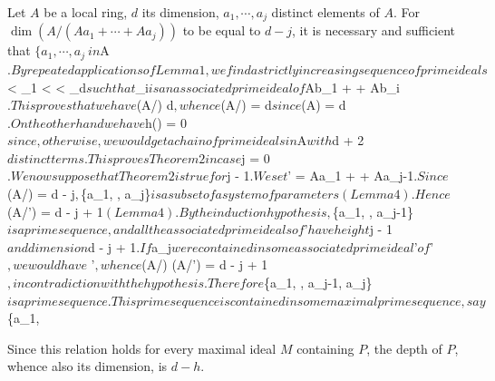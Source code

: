 Let $A$ be a local ring, $d$ its dimension, $a_1, \cdots, a_j$ distinct elements of $A$. For $\dim(A/(Aa_1 + \cdots + Aa_j))$ to be equal to $d-j$, it is necessary and sufficient that $\{a_1, \cdots, a_j\

in $A$. By repeated applications of Lemma 1, we find a strictly increasing sequence of prime ideals $ < _1 < \cdots < _d$ such that $_i$ is an associated prime ideal of $Ab_1 + \cdots + Ab_i$. This proves that we have $\dim (A/) \geq d$, whence $\dim (A/) = d$ since $\dim (A) = d$. On the other hand we have $h() = 0$ since, otherwise, we would get a chain of prime ideals in $A$ with $d + 2$ distinct terms. This proves Theorem 2 in case $j = 0$.

We now suppose that Theorem 2 is true for $j - 1$. We set $' = Aa_1 + \cdots + Aa_{j-1}$. Since $\dim (A/) = d - j$, $\{a_1, \cdots, a_j\}$ is a subset of a system of parameters (Lemma 4). Hence $\dim (A/') = d - j + 1$ (Lemma 4). By the induction hypothesis, $\{a_1, \cdots, a_{j-1}\}$ is a prime sequence, and all the associated prime ideals of $'$ have height $j - 1$ and dimension $d - j + 1$. If $a_j$ were contained in some associated prime ideal $'$ of $'$, we would have $ \subset {}'$, whence $\dim (A/) \geq \dim (A/') = d - j + 1$, in contradiction with the hypothesis. Therefore $\{a_1, \cdots, a_{j-1}, a_j\}$ is a prime sequence. This prime sequence is contained in some maximal prime sequence, say $\{a_1, \cdots

Since this relation holds for every maximal ideal $M$ containing $P$, the depth of $P$, whence also its dimension, is $d - h$.